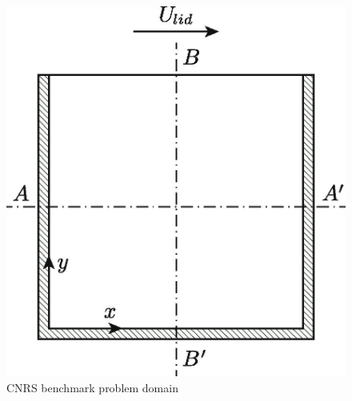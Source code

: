\begin{frame}
\begin{columns}
\begin{figure}
      \includegraphics[width=\columnwidth]{../images/cnrs-geometry}
      \caption{CNRS benchmark problem domain \cite{tiberga_results_2020}}
    \end{figure}
  \end{columns}
\end{frame}

